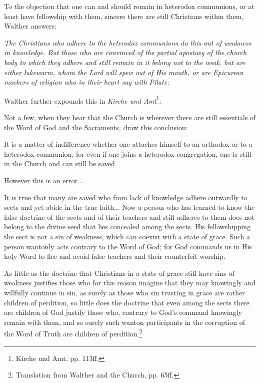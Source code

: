                 To the objection that one can and should remain in heterodox communions, or at least have fellowship with them, sincere there are still Christians within them, Walther answers: \begin{displayquote}\textit{The Christians who adhere to the heterodox communions do this out of weakness in knowledge.  But those who are convinced of the partial apostasy of the church body to which they adhere and still remain in it belong not to the weak, but are either lukewarm, whom the Lord will spew out of His mouth, or are Epicurean mockers of religion who in their heart say with Pilate:} \begin{displayquote}{\footnotesize What is truth?}}\footnote{Thesis 5 and 6. Synodalbericht Westlichen Districts 1870, Essays For The Church, Vol, I, pg 212-213}\end{displayquote}\end{displayquote}  Walther further expounds this in \textit{Kirche und Amt}\footnote{Kirche und Amt, pp. 113ff.}: \begin{fancyquotes}Not a few, when they hear that the Church is wherever there are still essentials of the Word of God and the Sacraments, draw this conclusion: \begin{displayquote}{\footnotesize It is a matter of indifference whether one attaches himself to an orthodox or to a heterodox communion; for even if one joins a heterodox congregation, one is still in the Church and can still be saved.}\end{displayquote}  However this is an error...\par  It is true that many are saved who from lack of knowledge adhere outwardly to sects and yet abide in the true faith... Now a person who has learned to know the false doctrine of the sects and of their teachers and still adheres to them does not belong to the divine seed that lies concealed among the sects.  His fellowshipping the sect is not a sin of weakness, which can coexist with a state of grace.  Such a person wantonly acts contrary to the Word of God; for God commands us in His holy Word to flee and avoid false teachers and their counterfeit worship.\par  As little as the doctrine that Christians in a state of grace still have sins of weakness justifies those who for this reason imagine that they may knowingly and willfully continue in sin, as surely as those who sin trusting in grace are rather children of perdition, so little does the doctrine that even among the sects there are children of God justify those who, contrary to God’s command knowingly remain with them, and so surely such wanton participants in the corruption of the Word of Truth are children of perdition.\footnote{Translation from Walther and the Church, pp. 65ff.}\end{fancyquotes}

